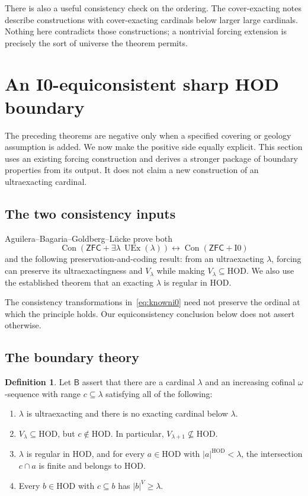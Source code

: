 \documentclass[11pt,letterpaper]{article}
\theoremstyle{definition}
\newtheorem{definition}{Definition}[section]
\newcommand{\ZFC}{\mathsf{ZFC}}
\newcommand{\HOD}{\mathrm{HOD}}
\newcommand{\UEx}{\operatorname{UEx}}
\newcommand{\Con}{\operatorname{Con}}
\newcommand{\Izero}{\mathrm{I0}}
\newcommand{\Bdry}{\mathsf{B}}
\begin{document}
There is also a useful consistency check on the ordering. The cover-exacting
notes describe constructions with cover-exacting cardinals below larger
large cardinals. \cite[discussion following Theorem 3.5]{cover} Nothing here
contradicts those constructions; a nontrivial forcing extension is precisely
the sort of universe the theorem permits.

\section{An I0-equiconsistent sharp HOD boundary}\label{sec:positive}

The preceding theorems are negative only when a specified covering or geology
assumption is added. We now make the positive side equally explicit. This
section uses an existing forcing construction and derives a stronger package
of boundary properties from its output. It does not claim a new construction
of an ultraexacting cardinal.

\subsection{The two consistency inputs}

Aguilera--Bagaria--Goldberg--L\"ucke prove both
\begin{equation}\label{eq:knowni0}
 \Con(\ZFC+\exists\lambda\,\UEx(\lambda))
 \longleftrightarrow\Con(\ZFC+\Izero)
\end{equation}
and the following preservation-and-coding result: from an ultraexacting
$\lambda$, forcing can preserve its ultraexactingness and $V_\lambda$ while
making $V_\lambda\subseteq\HOD$. \cite[Theorem 4.5; Proposition 3.9]{abgl}
We also use the established theorem that an exacting $\lambda$ is regular
in HOD. \cite[Theorem 2.10]{abl}

The consistency transformations in~\eqref{eq:knowni0} need not preserve the
ordinal at which the principle holds. Our equiconsistency conclusion below
does not assert otherwise.

\subsection{The boundary theory}

\begin{definition}\label{def:boundary}
Let $\Bdry$ assert that there are a cardinal $\lambda$ and an increasing
cofinal $\omega$-sequence with range $c\subseteq\lambda$ satisfying all of the
following:
\begin{enumerate}
\item $\lambda$ is ultraexacting and there is no exacting cardinal below $\lambda$.
\item $V_\lambda\subseteq\HOD$, but $c\notin\HOD$. In particular,
      $V_{\lambda+1}\nsubseteq\HOD$.
\item $\lambda$ is regular in HOD, and for every $a\in\HOD$ with
      $|a|^{\HOD}<\lambda$, the intersection $c\cap a$ is finite and belongs to HOD.
\item Every $b\in\HOD$ with $c\subseteq b$ has $|b|^V\geq\lambda$.
\end{enumerate}
\end{definition}
\end{document}
